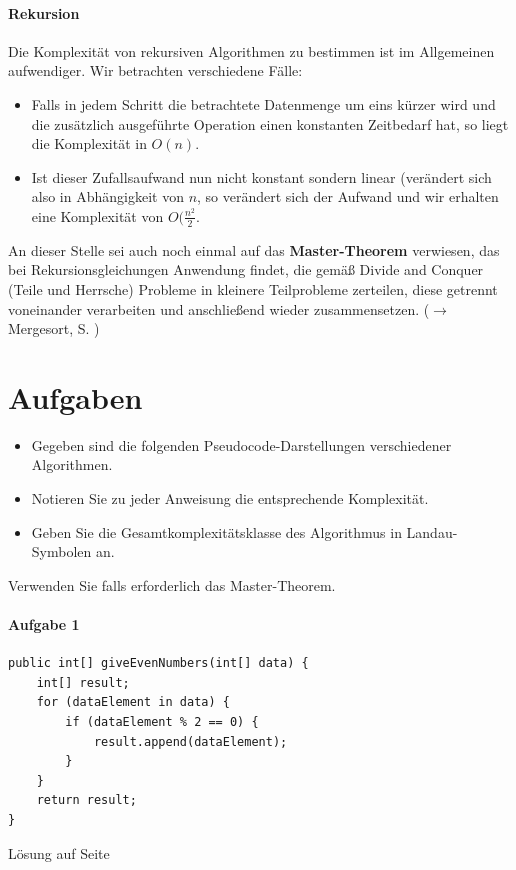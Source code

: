 \documentclass[11pt,a4paper]{scrartcl}
\begin{document}
\paragraph{Rekursion}
Die Komplexität von rekursiven Algorithmen zu bestimmen ist im Allgemeinen aufwendiger. Wir betrachten verschiedene Fälle:
\begin{itemize}
\item Falls in jedem Schritt die betrachtete Datenmenge um eins kürzer wird und die zusätzlich ausgeführte Operation einen konstanten Zeitbedarf hat, so liegt die Komplexität in $O(n)$.
\item Ist dieser Zufallsaufwand nun nicht konstant sondern linear (verändert sich also in Abhängigkeit von $n$, so verändert sich der Aufwand und wir erhalten eine Komplexität von $O(\frac{n^2}{2}$.
\end{itemize}
An dieser Stelle sei auch noch einmal auf das \textbf{Master-Theorem} verwiesen, das bei Rekursionsgleichungen Anwendung findet, die gemäß {\glqq}Divide and Conquer{\grqq} (Teile und Herrsche) Probleme in kleinere Teilprobleme zerteilen, diese getrennt voneinander verarbeiten und anschließend wieder zusammensetzen. ($\to$ Mergesort, S.  \pageref{mergesort})
\vspace{1cm}
\section*{Aufgaben}
\begin{itemize}
\item Gegeben sind die folgenden Pseudocode-Darstellungen verschiedener Algorithmen. 
\item Notieren Sie zu jeder Anweisung die entsprechende Komplexität.
\item Geben Sie die Gesamtkomplexitätsklasse des Algorithmus in Landau-Symbolen an.
\end{itemize}
Verwenden Sie falls erforderlich das Master-Theorem.
\paragraph{Aufgabe 1} \quad
\begin{lstlisting}
public int[] giveEvenNumbers(int[] data) {
	int[] result;
	for (dataElement in data) {
		if (dataElement % 2 == 0) {
			result.append(dataElement);		
		}	
	}
	return result;
}
\end{lstlisting}
\begin{flushright}
Lösung auf Seite \pageref{a1.5:lsg}
\end{flushright}
\end{document}
